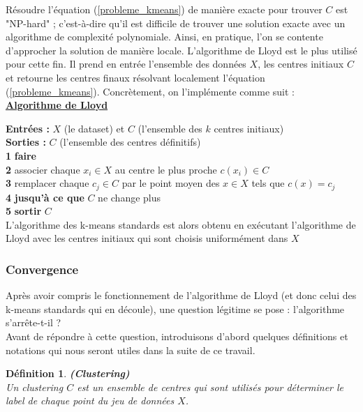 \documentclass[12pt,a4paper]{book}
\newtheorem{env_definition}{Définition}
\newcommand{\1}{\mathds{1}}
\begin{document}
Résoudre l'équation (\ref{probleme_kmeans}) de manière exacte pour trouver $C$  est "NP-hard" ; c'est-à-dire qu'il est difficile de trouver une solution exacte avec un algorithme de complexité polynomiale. Ainsi, en pratique, l'on se contente d'approcher la solution de manière locale. L'algorithme de Lloyd est le plus utilisé pour cette fin. Il prend en entrée l'ensemble des données $X$, les centres initiaux $C$  et retourne les centres finaux résolvant localement l'équation (\ref{probleme_kmeans}). Concrètement, on l'implémente comme suit :  \\

\noindent \textbf{\underline{Algorithme de Lloyd}}\label{algo_lloyd}

\noindent \textbf{Entrées : } $X$ (le dataset) et $C$ (l'ensemble des $k$ centres initiaux)\\
\noindent \textbf{Sorties : } $C$ (l'ensemble des centres définitifs) \\
\textbf{1} \textbf{faire}\\
\textbf{2} \indent associer chaque $x_i \in X$ au centre le plus proche $c(x_i) \in C$\\
\textbf{3} \indent remplacer chaque $c_j \in C$ par le point moyen des $x \in X$ tels que $c(x)=c_j$\\
\textbf{4} \textbf{jusqu'à ce que } $C$ ne change plus\\
\textbf{5} \textbf{sortir} $C$ \\

L'algorithme des k-means standards est alors obtenu en exécutant l'algorithme de Lloyd avec les centres initiaux qui sont choisis uniformément dans $X$
\subsubsection{Convergence}

Après avoir compris le fonctionnement de l'algorithme de Lloyd (et donc celui des k-means standards qui en découle), une question légitime se pose : l'algorithme s'arrête-t-il ?\\ Avant de répondre à cette question, introduisons d'abord quelques définitions et notations qui nous seront utiles dans la suite de ce travail.

	\begin{env_definition}\label{clustering}
		\textbf{(Clustering)}\\
		Un clustering $C$ est un ensemble de centres qui sont utilisés pour déterminer le label de chaque point du jeu de données $X$.
	\end{env_definition}
	
\end{document}
